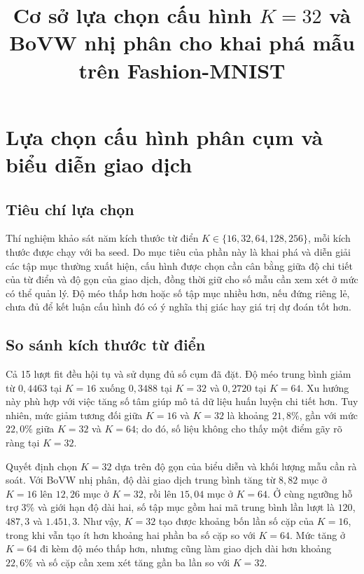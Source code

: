 \documentclass[conference]{IEEEtran}
\title{Cơ sở lựa chọn cấu hình $K=32$ và BoVW nhị phân cho khai phá mẫu trên Fashion-MNIST}
\author{\IEEEauthorblockN{Thành viên 3}}
\begin{document}
\maketitle

\section{Lựa chọn cấu hình phân cụm và biểu diễn giao dịch}
\label{sec:tv3_k32_selection}

\subsection{Tiêu chí lựa chọn}

Thí nghiệm khảo sát năm kích thước từ điển $K\in\{16,32,64,128,256\}$, mỗi kích thước được chạy với ba seed. Do mục tiêu của phần này là khai phá và diễn giải các tập mục thường xuất hiện, cấu hình được chọn cần cân bằng giữa độ chi tiết của từ điển và độ gọn của giao dịch, đồng thời giữ cho số mẫu cần xem xét ở mức có thể quản lý. Độ méo thấp hơn hoặc số tập mục nhiều hơn, nếu đứng riêng lẻ, chưa đủ để kết luận cấu hình đó có ý nghĩa thị giác hay giá trị dự đoán tốt hơn.

\subsection{So sánh kích thước từ điển}

Cả 15 lượt fit đều hội tụ và sử dụng đủ số cụm đã đặt. Độ méo trung bình giảm từ $0{,}4463$ tại $K=16$ xuống $0{,}3488$ tại $K=32$ và $0{,}2720$ tại $K=64$. Xu hướng này phù hợp với việc tăng số tâm giúp mô tả dữ liệu huấn luyện chi tiết hơn. Tuy nhiên, mức giảm tương đối giữa $K=16$ và $K=32$ là khoảng $21{,}8\%$, gần với mức $22{,}0\%$ giữa $K=32$ và $K=64$; do đó, số liệu không cho thấy một điểm gãy rõ ràng tại $K=32$.

Quyết định chọn $K=32$ dựa trên độ gọn của biểu diễn và khối lượng mẫu cần rà soát. Với BoVW nhị phân, độ dài giao dịch trung bình tăng từ $8{,}82$ mục ở $K=16$ lên $12{,}26$ mục ở $K=32$, rồi lên $15{,}04$ mục ở $K=64$. Ở cùng ngưỡng hỗ trợ 3\% và giới hạn độ dài hai, số tập mục gồm hai mã trung bình lần lượt là $120$, $487{,}3$ và $1.451{,}3$. Như vậy, $K=32$ tạo được khoảng bốn lần số cặp của $K=16$, trong khi vẫn tạo ít hơn khoảng hai phần ba số cặp so với $K=64$. Mức tăng ở $K=64$ đi kèm độ méo thấp hơn, nhưng cũng làm giao dịch dài hơn khoảng $22{,}6\%$ và số cặp cần xem xét tăng gần ba lần so với $K=32$.
\end{document}
